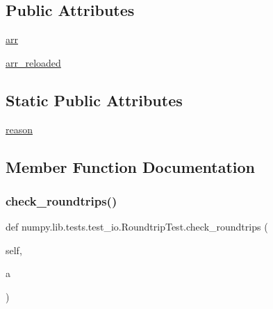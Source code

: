 \subsection*{Public Attributes}
\begin{DoxyCompactItemize}
\item 
\hyperlink{classnumpy_1_1lib_1_1tests_1_1test__io_1_1RoundtripTest_aa0d757ff557f80a00dd0369df1b66df2}{arr}
\item 
\hyperlink{classnumpy_1_1lib_1_1tests_1_1test__io_1_1RoundtripTest_a9887386d18c77bed59a852568c9cbde2}{arr\+\_\+reloaded}
\end{DoxyCompactItemize}
\subsection*{Static Public Attributes}
\begin{DoxyCompactItemize}
\item 
\hyperlink{classnumpy_1_1lib_1_1tests_1_1test__io_1_1RoundtripTest_add6328317aa5c0b3098ac36391604d56}{reason}
\end{DoxyCompactItemize}


\subsection{Member Function Documentation}
\mbox{\label{classnumpy_1_1lib_1_1tests_1_1test__io_1_1RoundtripTest_ab4982730f89d39e519836fbcd7de468f}} 
\subsubsection{\texorpdfstring{check\+\_\+roundtrips()}{check\_roundtrips()}}
{\footnotesize\ttfamily def numpy.\+lib.\+tests.\+test\+\_\+io.\+Roundtrip\+Test.\+check\+\_\+roundtrips (\begin{DoxyParamCaption}\item[{}]{self,  }\item[{}]{a }\end{DoxyParamCaption})}

\mbox{\label{classnumpy_1_1lib_1_1tests_1_1test__io_1_1RoundtripTest_ae1c15bc5691008062e774b5f4cb5c7bc}} 
